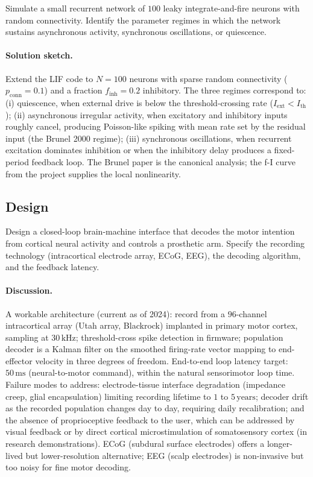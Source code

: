 \begin{exercise}
Simulate a small recurrent network of $100$ leaky integrate-and-fire
neurons with random connectivity. Identify the parameter regimes in
which the network sustains asynchronous activity, synchronous
oscillations, or quiescence.
\end{exercise}

\paragraph{Solution sketch.}
Extend the LIF code to $N = 100$ neurons with sparse random
connectivity ($p_{\text{conn}} = 0.1$) and a fraction $f_{\text{inh}}
= 0.2$ inhibitory. The three regimes correspond to: (i) quiescence,
when external drive is below the threshold-crossing rate
($I_{\text{ext}} < I_{\text{th}}$); (ii) asynchronous irregular
activity, when excitatory and inhibitory inputs roughly cancel,
producing Poisson-like spiking with mean rate set by the residual
input (the Brunel 2000 regime); (iii) synchronous oscillations, when
recurrent excitation dominates inhibition or when the inhibitory
delay produces a fixed-period feedback loop. The Brunel paper is the
canonical analysis; the f-I curve from the project supplies the
local nonlinearity.

\subsection*{Design}

\begin{exercise}
Design a closed-loop brain-machine interface that decodes the motor
intention from cortical neural activity and controls a prosthetic
arm. Specify the recording technology (intracortical electrode array,
ECoG, EEG), the decoding algorithm, and the feedback latency.
\end{exercise}

\paragraph{Discussion.}
A workable architecture (current as of 2024): record from a
$96$-channel intracortical array (Utah array, Blackrock) implanted in
primary motor cortex, sampling at $30\,\text{kHz}$; threshold-cross
spike detection in firmware; population decoder is a Kalman filter
on the smoothed firing-rate vector mapping to end-effector velocity in
three degrees of freedom. End-to-end loop latency target: $50\,\text{ms}$
(neural-to-motor command), within the natural sensorimotor loop time.
Failure modes to address: electrode-tissue interface degradation
(impedance creep, glial encapsulation) limiting recording lifetime to
$1$ to $5\,\text{years}$; decoder drift as the recorded population
changes day to day, requiring daily recalibration; and the absence of
proprioceptive feedback to the user, which can be addressed by visual
feedback or by direct cortical microstimulation of somatosensory
cortex (in research demonstrations). ECoG (subdural surface
electrodes) offers a longer-lived but lower-resolution alternative;
EEG (scalp electrodes) is non-invasive but too noisy for fine motor
decoding.

